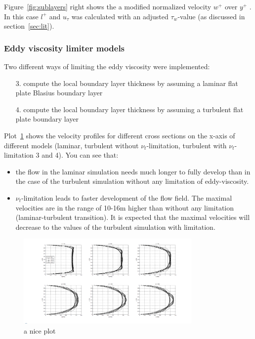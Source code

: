 \documentclass[11pt,a4paper]{article}
\begin{document}
\noindent Figure~\ref{fig:sublayers} right shows the a modified normalized velocity $w^+$ over $y^+$ . In this case $l^+$ and $u_{\tau}$ was calculated with an adjusted $\tau_w$-value (as discussed in section~\ref{sec:lit}).

\subsubsection{Eddy viscosity limiter models}

Two different ways of limiting the eddy viscosity were implemented:
\begin{itemize}
\item[3.] compute the local boundary layer thickness by assuming a laminar flat plate Blasius boundary layer
\item[4.] compute the local boundary layer thickness by assuming a turbulent flat plate boundary layer
\end{itemize}

\noindent Plot~\ref{fig:devel} shows the velocity profiles for different cross sections on the x-axis of different models (laminar, turbulent without $\nu_t$-limitation, turbulent with $\nu_t$-limitation 3 and 4). You can see that:
\begin{itemize}
\item the flow in the laminar simulation needs much longer to fully develop than in the case of the turbulent simulation without any limitation of eddy-viscosity.
\item $\nu_t$-limitation leads to faster development of the flow field. The maximal velocities are in the range of 10-16m higher than without any limitation (laminar-turbulent transition). It is expected that the maximal velocities will decrease to the values of the turbulent simulation with limitation.
\end{itemize}

\begin{figure}[h]
    \centering
    \includegraphics[trim={5cm 1.5cm 4cm 1.5cm},clip,angle=90,origin=c, width=0.8\textwidth]{yu}
    \caption{a nice plot}
    \label{fig:devel}
\end{figure}
\end{document}
